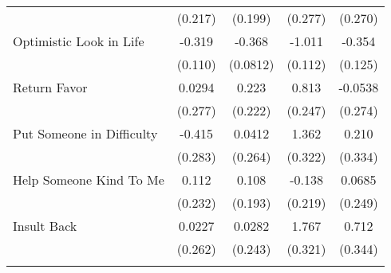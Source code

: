 {\begin{tabular}{l*{4}{c}}
            &     (0.217)         &     (0.199)         &     (0.277)         &     (0.270)         \\
[1em]
Optimistic Look in Life&      -0.319\sym{**} &      -0.368\sym{***}&      -1.011\sym{***}&      -0.354\sym{**} \\
            &     (0.110)         &    (0.0812)         &     (0.112)         &     (0.125)         \\
[1em]
Return Favor&      0.0294         &       0.223         &       0.813\sym{***}&     -0.0538         \\
            &     (0.277)         &     (0.222)         &     (0.247)         &     (0.274)         \\
[1em]
Put Someone in Difficulty&      -0.415         &      0.0412         &       1.362\sym{***}&       0.210         \\
            &     (0.283)         &     (0.264)         &     (0.322)         &     (0.334)         \\
[1em]
Help Someone Kind To Me&       0.112         &       0.108         &      -0.138         &      0.0685         \\
            &     (0.232)         &     (0.193)         &     (0.219)         &     (0.249)         \\
[1em]
Insult Back &      0.0227         &      0.0282         &       1.767\sym{***}&       0.712\sym{*}  \\
            &     (0.262)         &     (0.243)         &     (0.321)         &     (0.344)         \\
\hline\hline
{}\\
\end{tabular}
}
